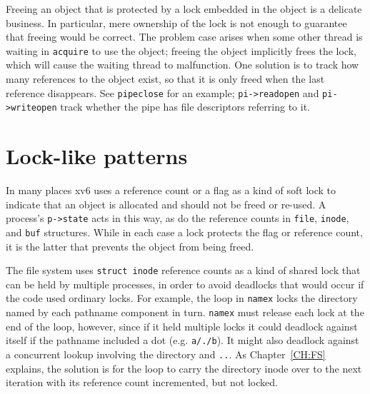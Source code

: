 Freeing an object that is protected by a lock embedded in the object
is a delicate business. In particular, mere ownership of the lock is
not enough to guarantee that freeing would be correct. The problem
case arises when some other thread is waiting in {\tt acquire} to use
the object; freeing the object implicitly frees the lock, which will
cause the waiting thread to malfunction. One solution is to track how
many references to the object exist, so that it is only freed when the
last reference disappears. See {\tt pipeclose}
 for an example;
{\tt pi->readopen} and {\tt pi->writeopen} track whether
the pipe has file descriptors referring to it.


\section{Lock-like patterns}

In many places xv6 uses a reference count or a flag as a kind of soft
lock to indicate that an object is allocated and should not be freed
or re-used. A process's {\tt p->state} acts in this way, as do the
reference counts in {\tt file}, {\tt inode}, and {\tt buf} structures.
While in each case a lock protects the flag or reference count, it is
the latter that prevents the object from being freed.

The file system uses {\tt struct inode} reference counts as a kind of
shared lock that can be held by multiple processes, in order to avoid
deadlocks that would occur if the code used ordinary locks. For
example, the loop in {\tt namex}  locks
the directory named by each pathname component in turn. {\tt namex}
must release each lock at the end of the loop, however, since if it
held multiple locks it could deadlock against itself if the pathname
included a dot (e.g. {\tt a/./b}). It might also deadlock against a
concurrent lookup involving the directory and {\tt ..}. As
Chapter~\ref{CH:FS} explains, the solution is for the loop to carry
the directory inode over to the next iteration with its reference
count incremented, but not locked.

